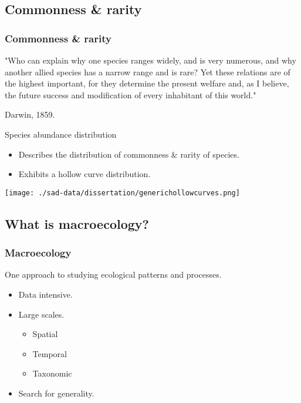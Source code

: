 \documentclass[14pt]{beamer}
\begin{document}
\subsection{Commonness & rarity}
\begin{frame}[t]
\frametitle{Commonness \& rarity}
"Who can explain why one species ranges widely, and is very numerous, and why another allied species has a narrow range and is rare?  Yet these relations are of the highest important, for they determine the present welfare and, as I believe, the future success and modification of every inhabitant of this world."  


Darwin, 1859.

\end{frame}

\begin{frame}
Species abundance distribution
\begin{itemize}
\item Describes the distribution of commonness \& rarity of species.
\item Exhibits a hollow curve distribution.
\end{itemize}
\texttt{[image: ./sad-data/dissertation/generichollowcurves.png]}
\end{frame}

\subsection{What is macroecology?}
\begin{frame}[t]
\frametitle{Macroecology}
\normalsize One approach to studying ecological patterns and processes.\\
\begin{itemize}
\item Data intensive.
\item Large scales.
\begin{itemize}
\item Spatial
\item Temporal
\item Taxonomic
\end{itemize}
\item Search for generality.
\end{itemize}
\end{frame}
\end{document}
